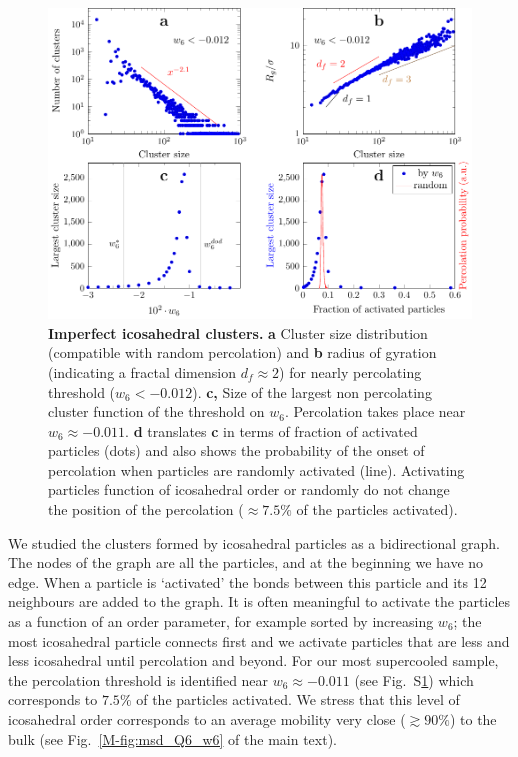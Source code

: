 \documentclass[prl,twocolumn,notitlepage]{revtex4-1}
\begin{document}
\begin{figure}
\begin{center}
\includegraphics{generate_figures-figure7.pdf}
\end{center}
	\caption{\textbf{Imperfect icosahedral clusters.} \textbf{a} Cluster size distribution (compatible with random percolation) and \textbf{b} radius of gyration (indicating a fractal dimension $d_f\approx 2$) for nearly percolating threshold ($w_6<-0.012$). \textbf{c,} Size of the largest non percolating cluster function of the threshold on $w_6$. Percolation takes place near $w_6\approx -0.011$. \textbf{d} translates \textbf{c} in terms of fraction of activated particles (dots) and also shows the probability of the onset of percolation when particles are randomly activated (line). Activating particles function of icosahedral order or randomly do not change the position of the percolation ($\approx7.5\%$ of the particles activated).}
	\label{fig:percolation}
\end{figure}

We studied the clusters formed by icosahedral particles as a bidirectional graph. The nodes of the graph are all the particles, and at the beginning we have no edge. When a particle is `activated' the bonds between this particle and its 12 neighbours are added to the graph. It is often meaningful to activate the particles as a function of an order parameter, for example sorted by increasing $w_6$; the most icosahedral particle connects first and we activate particles that are less and less icosahedral until percolation and beyond. For our most supercooled sample, the percolation threshold is identified near $w_6\approx -0.011$ (see Fig.~S\ref{fig:percolation}) which corresponds to $7.5\%$ of the particles activated. We stress that this level of icosahedral order corresponds to an average mobility very close ($\gtrsim 90\%$) to the bulk (see Fig.~\ref{M-fig:msd_Q6_w6} of the main text).
\end{document}

